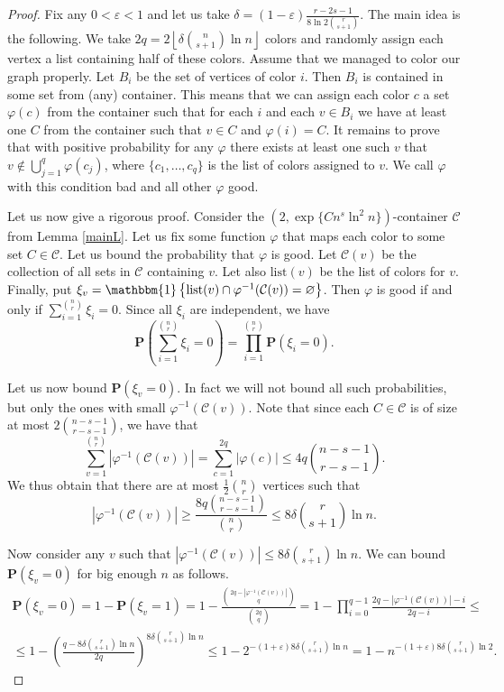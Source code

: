 \documentclass[12pt]{article}
\theoremstyle{remark}
\theoremstyle{definition}
\newcommand{\mP}{\mathbf{P}}
\newcommand{\lst}{\mathrm{list}}
\newcommand{\ind}[1]{\mathbbm{1}\left\{#1\right\}}
\newcommand{\skob}[1]{\left(#1\right)}
\newcommand{\flr}[1]{\left\lfloor#1\right\rfloor}
\begin{document}
\begin{proof}
    Fix any $0 < \varepsilon < 1$ and let us take $\delta = (1-\varepsilon)\frac{r-2s-1}{8\ln 2\binom{r}{s+1}}$. The main idea is the following. We take $2q = 2\flr{\delta \binom{n}{s+1}\ln n}$ colors and randomly assign each vertex a list containing half of these colors. Assume that we managed to color our graph properly. Let $B_i$ be the set of vertices of color $i$. Then $B_i$ is contained in some set from (any) container. This means that we can assign each color $c$ a set $\varphi(c)$ from the container such that for each $i$ and each $v \in B_i$ we have at least one $C$ from the container such that $v \in C$ and $\varphi(i) = C$. It remains to prove that with positive probability for any $\varphi$ there exists at least one such $v$ that $v \notin \bigcup_{j = 1}^{q} \varphi(c_j)$, where $\{c_1, \dotsc, c_q\}$ is the list of colors assigned to $v$. We call $\varphi$ with this condition bad and all other $\varphi$ good.

    Let us now give a rigorous proof. Consider the $(2, \exp\{Cn^{s}\ln^2n\})$-container $\mathcal{C}$ from Lemma \ref{mainL}. Let us fix some function $\varphi$ that maps each color to some set $C \in \mathcal{C}$. Let us bound the probability that $\varphi$ is good. Let $\mathcal{C}(v)$ be the collection of all sets in $\mathcal{C}$ containing $v$. Let also $\lst(v)$ be the list of colors for $v$. Finally, put $\xi_v = \ind{\lst(v) \cap \varphi^{-1}(\mathcal{C}(v)) = \varnothing}$. Then $\varphi$ is good if and only if $\sum_{i =1}^{\binom{n}{r}}\xi_i = 0$. Since all $\xi_i$ are independent, we have
    $$
        \mP\skob{\sum_{i = 1}^{\binom{n}{r}}\xi_i = 0} = \prod_{i = 1}^{\binom{n}{r}}\mP(\xi_i = 0).
    $$

    Let us now bound $\mP(\xi_v = 0)$. In fact we will not bound all such probabilities, but only the ones with small $\varphi^{-1}(\mathcal{C}(v))$. Note that since each $C \in \mathcal{C}$ is of size at most $2\binom{n-s-1}{r-s-1}$, we have that 
    $$
    \sum_{v = 1}^{\binom{n}{r}}|\varphi^{-1}(\mathcal{C}(v))| = \sum_{c = 1}^{2q}|\varphi(c)| \leq 4q\binom{n-s-1}{r-s-1}.
    $$
    We thus obtain that there are at most $\frac{1}{2}\binom{n}{r}$ vertices such that 
    $$
    |\varphi^{-1}(\mathcal{C}(v))| \geq \frac{8q\binom{n-s-1}{r-s-1}}{\binom{n}{r}} \leq 8\delta\binom{r}{s+1}\ln n.
    $$

    Now consider any $v$ such that $|\varphi^{-1}(\mathcal{C}(v))| \leq 8\delta\binom{r}{s+1}\ln n$. We can bound $\mP(\xi_v = 0)$ for big enough $n$ as follows.
    \begin{multline*}
        \mP(\xi_v = 0) = 1- \mP(\xi_v = 1) = 1 -\frac{\binom{2q-|\varphi^{-1}(\mathcal{C}(v))|}{q}}{\binom{2q}{q}} = 1 -\prod_{i = 0}^{q-1}\frac{2q-|\varphi^{-1}(\mathcal{C}(v))| - i}{2q-i} \leq \\ \leq 1 - \skob{\frac{q -8\delta\binom{r}{s+1}\ln n}{2q}}^{8\delta\binom{r}{s+1}\ln n} \leq 1 - 2^{-(1+\varepsilon)8\delta\binom{r}{s+1}\ln n} = 1 - n^{-(1+\varepsilon)8\delta\binom{r}{s+1}\ln 2}. 
    \end{multline*}


\end{proof}
\end{document}
